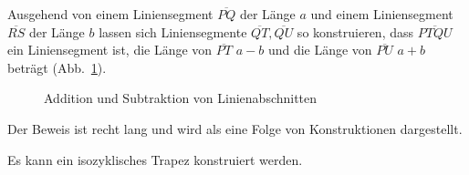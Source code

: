 \begin{theorem}\label{thm.add-subtract-mm}
Ausgehend von einem Liniensegment $\overline{PQ}$ der Länge $a$ und einem Liniensegment $\overline{RS}$ der Länge $b$ lassen sich Liniensegmente $\overline{QT}, \overline{QU}$ so konstruieren, dass $\overline{PTQU}$ ein Liniensegment ist, die Länge von $\overline{PT}$ $a-b$ und die Länge von $\overline{PU}$ $a+b$ beträgt (Abb.~\ref{f.compass-add1}).
\end{theorem}
\begin{figure}[ht]
\begin{center}
\end{center}
\caption{Addition und Subtraktion von Linienabschnitten}\label{f.compass-add1}
\end{figure}

Der Beweis ist recht lang und wird als eine Folge von Konstruktionen dargestellt.

\begin{theorem}\label{thm.compass-trapezoid}
Es kann ein isozyklisches Trapez konstruiert werden.
\end{theorem}

